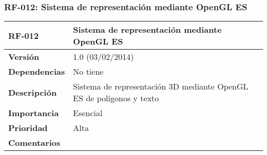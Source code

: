 \subsubsection*{RF-012: Sistema de representación mediante OpenGL ES}
\begin{tabular}{|p{3cm}|p{11.5cm}|}
\hline
\textbf{RF-012}         & \textbf{Sistema de representación mediante OpenGL ES}                                                      \\ \hline
\textbf{Versión}        & 1.0 (03/02/2014)                                                                                           \\ \hline
\textbf{Dependencias}   & No tiene                                                                                                   \\ \hline
\textbf{Descripción}    & Sistema de representación 3D mediante OpenGL ES de polígonos y texto                                       \\ \hline 
\textbf{Importancia}    & Esencial                                                                                                   \\ \hline
\textbf{Prioridad}      & Alta                                                                                                       \\ \hline
\textbf{Comentarios}    &                                                                                                            \\ \hline
\end{tabular}


